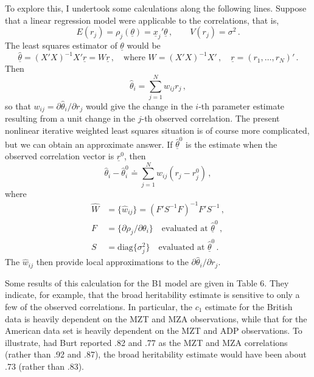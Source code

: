 ﻿\documentclass[12pt]{article}
\begin{document}
To explore this, I undertook some calculations along the following lines. Suppose that a linear regression model were applicable to the correlations, that is,
\begin{equation*}
E(r_j) = \rho_j(\underline{\theta}) = \underline{x}_j' \underline{\theta} \, , \qquad V(r_j) = \sigma^2 \, .
\end{equation*}
The least squares estimator of $\underline{\theta}$ would be
\begin{equation*}
\hat{\underline{\theta}} = (X'X)^{-1}X'\underline{r} = W\underline{r} \, , \quad \text{where } W = (X'X)^{-1}X' \, , \quad \underline{r} = (r_1,\ldots,r_N)' \, .
\end{equation*}
Then
\begin{equation*}
\hat\theta_i = \sum_{j=1}^{N} w_{ij} r_j \, ,
\end{equation*}
so that $w_{ij} = \partial\hat\theta_i/\partial r_j$ would give the change in the $i$-th parameter estimate resulting from a unit change in the $j$-th observed correlation. The present nonlinear iterative weighted least squares situation is of course more complicated, but we can obtain an approximate answer. If $\hat{\underline\theta}^0$ is the estimate when the observed correlation vector is $\underline r^0$, then
\begin{equation*}
\hat\theta_i - \hat\theta_i^0 \doteq \sum_{j=1}^{N} \hat w_{ij}(r_j - r_j^0) \, ,
\end{equation*}
where
\begin{align*}
\hat W &= \{\hat w_{ij}\} = (F'S^{-1}F)^{-1}F'S^{-1} \, , \\
F &= \{\partial\rho_j/\partial\theta_i\} \quad \text{evaluated at } \hat{\underline\theta}^0 \, , \\
S &= \mathrm{diag}\{\sigma_j^2\} \quad \text{evaluated at } \hat{\underline\theta}^0 \, .
\end{align*}
The $\hat w_{ij}$ then provide local approximations to the $\partial\hat\theta_i/\partial r_j$.

Some results of this calculation for the B1 model are given in Table 6. They indicate, for example, that the broad heritability estimate is sensitive to only a few of the observed correlations. In particular, the $c_1$ estimate for the British data is heavily dependent on the MZT and MZA observations, while that for the American data set is heavily dependent on the MZT and ADP observations. To illustrate, had Burt reported .82 and .77 as the MZT and MZA correlations (rather than .92 and .87), the broad heritability estimate would have been about .73 (rather than .83).
\end{document}
